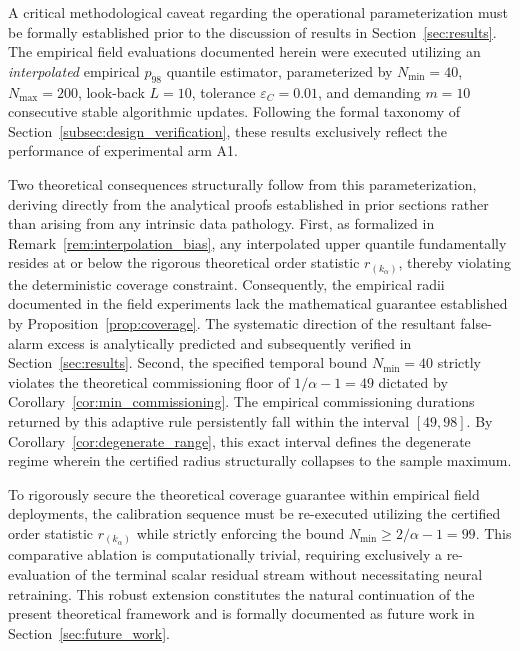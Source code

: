 \documentclass[a4paper]{cas-sc}
\newcommand{\residual}{\ensuremath{r}}
\begin{document}
A critical methodological caveat regarding the operational parameterization must be formally established prior to the discussion of results in Section~\ref{sec:results}. The empirical field evaluations documented herein were executed utilizing an \emph{interpolated} empirical \(p_{98}\) quantile estimator, parameterized by \(N_{\min}=40\), \(N_{\max}=200\), look-back \(L=10\), tolerance \(\varepsilon_C=0.01\), and demanding \(m=10\) consecutive stable algorithmic updates. Following the formal taxonomy of Section~\ref{subsec:design_verification}, these results exclusively reflect the performance of experimental arm A1.

Two theoretical consequences structurally follow from this parameterization, deriving directly from the analytical proofs established in prior sections rather than arising from any intrinsic data pathology. First, as formalized in Remark~\ref{rem:interpolation_bias}, any interpolated upper quantile fundamentally resides at or below the rigorous theoretical order statistic \(\residual_{(k_\alpha)}\), thereby violating the deterministic coverage constraint. Consequently, the empirical radii documented in the field experiments lack the mathematical guarantee established by Proposition~\ref{prop:coverage}. The systematic direction of the resultant false-alarm excess is analytically predicted and subsequently verified in Section~\ref{sec:results}. Second, the specified temporal bound \(N_{\min}=40\) strictly violates the theoretical commissioning floor of \(1/\alpha-1=49\) dictated by Corollary~\ref{cor:min_commissioning}. The empirical commissioning durations returned by this adaptive rule persistently fall within the interval \([49,98]\). By Corollary~\ref{cor:degenerate_range}, this exact interval defines the degenerate regime wherein the certified radius structurally collapses to the sample maximum.

To rigorously secure the theoretical coverage guarantee within empirical field deployments, the calibration sequence must be re-executed utilizing the certified order statistic \(\residual_{(k_\alpha)}\) while strictly enforcing the bound \(N_{\min}\ge 2/\alpha-1=99\). This comparative ablation is computationally trivial, requiring exclusively a re-evaluation of the terminal scalar residual stream without necessitating neural retraining. This robust extension constitutes the natural continuation of the present theoretical framework and is formally documented as future work in Section~\ref{sec:future_work}.
\end{document}
